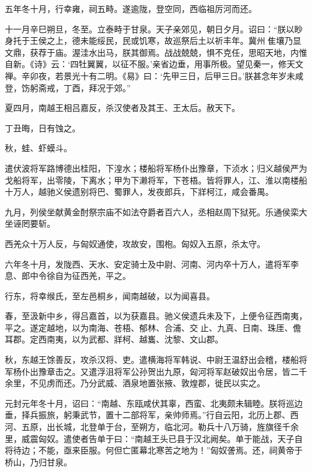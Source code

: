 \documentclass[12pt,UTF8]{ctexbook}
\begin{document}
五年冬十月，行幸雍，祠五畤。遂逾陇，登空同，西临祖厉河而还。



十一月辛巳朔旦，冬至。立泰畤于甘泉。天子亲郊见，朝日夕月。诏曰：“朕以眇身托于王侯之上，德未能绥民，民或饥寒，故巡祭后土以祈丰年。冀州隹壤乃显文鼎，获荐于庙。渥洼水出马，朕其御焉。战战兢兢，惧不克任，思昭天地，内惟自新。《诗》云：‘四牡翼翼，以征不服。’亲省边垂，用事所极。望见秦一，修天文禅。辛卯夜，若景光十有二明。《易》曰：‘先甲三日，后甲三日。’朕甚念年岁未咸登，饬躬斋戒，丁酉，拜况于郊。”



夏四月，南越王相吕嘉反，杀汉使者及其王、王太后。赦天下。



丁丑晦，日有蚀之。



秋，蛙、虾蟆斗。



遣伏波将军路博德出桂阳，下湟水；楼船将军杨仆出豫章，下浈水；归义越侯严为戈船将军，出零陵，下离水；甲为下濑将军，下苍梧。皆将罪人，江、淮以南楼船十万人，越驰义侯遗别将巴、蜀罪人，发夜郎兵，下牂柯江，咸会番禺。



九月，列侯坐献黄金酎祭宗庙不如法夺爵者百六人，丞相赵周下狱死。乐通侯栾大坐诬罔要斩。



西羌众十万人反，与匈奴通使，攻故安，围枹。匈奴入五原，杀太守。



六年冬十月，发陇西、天水、安定骑士及中尉、河南、河内卒十万人，遣将军李息、郎中令徐自为征西羌，平之。



行东，将幸缑氏，至左邑桐乡，闻南越破，以为闻喜县。



春，至汲新中乡，得吕嘉首，以为获嘉县。驰义侯遗兵未及下，上便令征西南夷，平之。遂定越地，以为南海、苍梧、郁林、合浦、交止、九真、日南、珠厓、儋耳郡。定西南夷，以为武都、牂柯、越巂、沈黎、文山郡。



秋，东越王馀善反，攻杀汉将、吏。遣横海将军韩说、中尉王温舒出会稽，楼船将军杨仆出豫章击之。又遣浮沮将军公孙贺出九原，匈河将军赵破奴出令居，皆二千余里，不见虏而还。乃分武威、酒泉地置张掖、敦煌郡，徙民以实之。



元封元年冬十月，诏曰：“南越、东瓯咸伏其辜，西蛮、北夷颇未辑睦。朕将巡边垂，择兵振旅，躬秉武节，置十二部将军，亲帅师焉。”行自云阳，北历上郡、西河、五原，出长城，北登单于台，至朔方，临北河。勒兵十八万骑，旌旗径千余里，威震匈奴。遣使者告单于曰：“南越王头已县于汉北阙矣。单于能战，天子自将待边；不能，亟来臣服。何但亡匿幕北寒苦之地为！”匈奴詟焉。还，祠黄帝于桥山，乃归甘泉。
\end{document}
